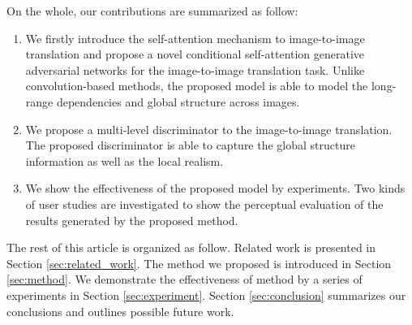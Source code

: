 On the whole, our contributions are summarized as follow:
%
\begin{enumerate}
	\item We firstly introduce the self-attention mechanism to image-to-image translation and propose a novel conditional self-attention generative adversarial networks for the image-to-image translation task. Unlike convolution-based methods, the proposed model is able to model the long-range dependencies and global structure across images.
	\item We propose a multi-level discriminator to the image-to-image translation. The proposed discriminator is able to capture the global structure information as well as the local realism. 
	\item We show the effectiveness of the proposed model by experiments. Two kinds of user studies are investigated to show the perceptual evaluation of the results generated by the proposed method. 
	
\end{enumerate}

 

The rest of this article is organized as follow. Related work is presented in Section \ref{sec:related_work}. The method we proposed is introduced in Section \ref{sec:method}. We demonstrate the effectiveness of method by a series of experiments in Section \ref{sec:experiment}. Section \ref{sec:conclusion} summarizes our conclusions and outlines 
possible future work.